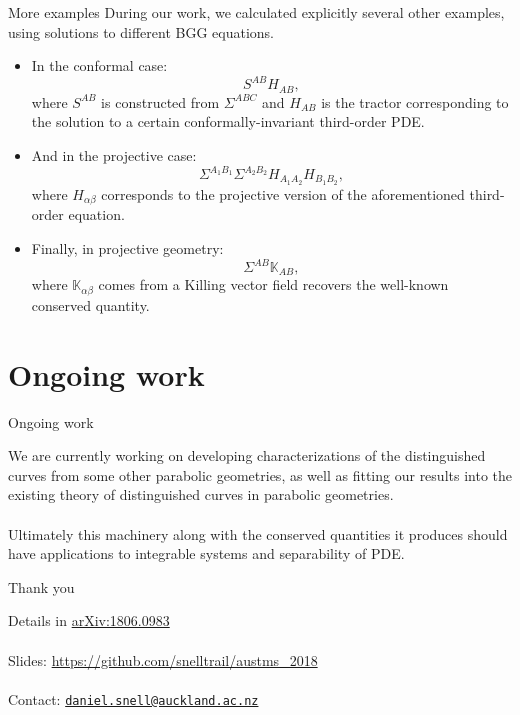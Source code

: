 \documentclass{beamer}
\begin{document}
\begin{frame}{More examples}
  During our work, we calculated explicitly several other examples, using
  solutions to different BGG equations.\\
  \begin{itemize}
    \pause
    \item In the conformal case:
      \[
      S^{AB} H_{AB},
      \]
      where \( S^{AB} \) is constructed from \( \Sigma^{ABC} \) and
      \( H_{AB} \) is the tractor corresponding to the solution to a certain
      conformally-invariant third-order PDE.
    \pause
    \item And in the projective case:
      \[
        \Sigma^{A_1 B_1} \Sigma^{A_2 B_2} H_{A_1
        A_2} H_{B_1 B_2},
      \]
      where \( H_{\alpha \beta} \) corresponds to the projective version of the
      aforementioned third-order equation.\\
      \pause
    \item Finally, in projective geometry:
      \[
        \Sigma^{A B} \mathbb{K}_{A B},
      \]
      where \( \mathbb{K}_{\alpha \beta} \) comes from a Killing vector field recovers the well-known conserved quantity.
  \end{itemize}
\end{frame}

\section{Ongoing work}

\begin{frame}{Ongoing work}
  \begin{block}{}
    We are currently working on developing characterizations of the distinguished curves from some other parabolic geometries, as well as fitting our results into the existing theory of distinguished curves in parabolic geometries. \\
    \hspace{1em}\\
    \pause
    Ultimately this machinery along with the conserved quantities it produces should have applications to integrable systems and separability of PDE.
  \end{block}
\end{frame}

\begin{frame}{Thank you}
  \begin{block}{}
  Details in \href{https://arxiv.org/abs/1806.09830}{arXiv:1806.0983}\\
  \hspace{1em}\\
  Slides: \href{https://github.com/snelltrail/austms_2018}{https://github.com/snelltrail/austms\_2018}\\
  \hspace{1em}\\
  Contact: \texttt{\href{mailto:daniel.snell@auckland.ac.nz}{daniel.snell@auckland.ac.nz}}
  \end{block}
\end{frame}
\end{document}
